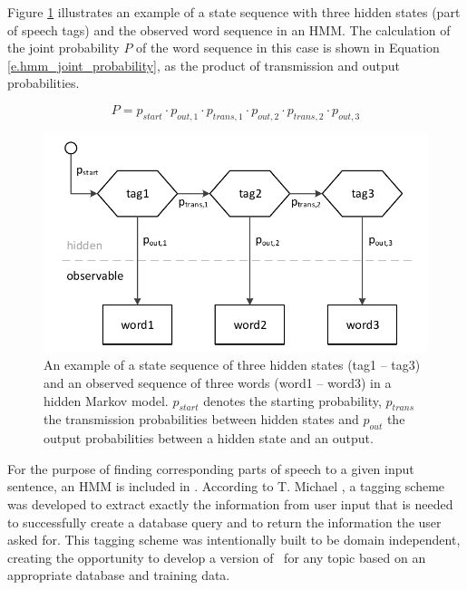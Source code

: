 Figure \ref{f.hmm_structure} illustrates an example of a state sequence with three hidden states (part of speech tags) and the observed word sequence in an HMM. The calculation of the joint probability $P$ of the word sequence in this case is shown in Equation \ref{e.hmm_joint_probability}, as the product of transmission and output probabilities.

\begin{equation}
    P = p_{start}\cdot p_{out,1}\cdot p_{trans,1}\cdot p_{out,2}\cdot p_{trans,2}\cdot p_{out,3} \label{e.hmm_joint_probability}
\end{equation}

\vspace{1em}
\begin{figure}[H]
	\includegraphics[width=\textwidth]{images/hmm_structure}
	\vspace{.8em}
	\caption[Structure of a Hidden Markov Model]{An example of a state sequence of three hidden states (tag1 -- tag3) and an observed sequence of three words (word1 -- word3) in a hidden Markov model. $p_{start}$ denotes the starting probability, $p_{trans}$ the transmission probabilities between hidden states and $p_{out}$ the output probabilities between a hidden state and an output.}
	\label{f.hmm_structure}
	\vspace{.8em}
\end{figure}

For the purpose of finding corresponding parts of speech to a given input sentence, an HMM is included in \Alex. According to T. Michael \cite{michael2016}, a tagging scheme was developed to extract exactly the information from user input that is needed to successfully create a database query and to return the information the user asked for. This tagging scheme was intentionally built to be domain independent, creating the opportunity to develop a version of \Alex\ for any topic based on an appropriate database and training data.

